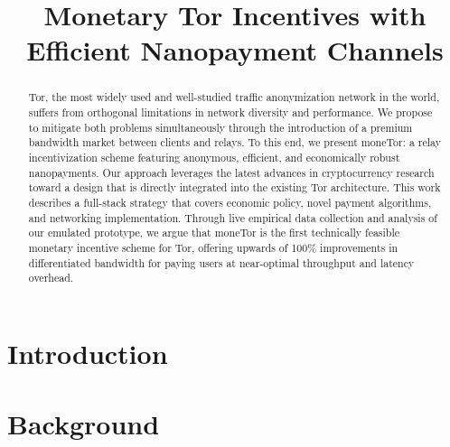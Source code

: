 \documentclass[USenglish,oneside,twocolumn]{article}
\begin{document}
 

\title{\huge Monetary Tor Incentives with Efficient Nanopayment Channels} %


\begin{abstract}
{Tor, the most widely used and well-studied traffic anonymization network in
  the world, suffers from orthogonal limitations in network diversity and
  performance. We propose to mitigate both problems simultaneously through the
  introduction of a premium bandwidth market between clients and relays. To this
  end, we present moneTor: a relay incentivization scheme featuring anonymous,
  efficient, and economically robust nanopayments. Our approach leverages the
  latest advances in cryptocurrency research toward a design that is directly
  integrated into the existing Tor architecture. This work describes a
  full-stack strategy that covers economic policy, novel payment algorithms, and
  networking implementation. Through live empirical data collection and analysis
  of our emulated prototype, we argue that moneTor is the first technically
  feasible monetary incentive scheme for Tor, offering upwards of 100\%
  improvements in differentiated bandwidth for paying users at near-optimal
  throughput and latency overhead.}
\end{abstract}



  
  
 \maketitle


\section{Introduction}
\label{sec:introduction}


\section{Background}
\label{sec:background}

\end{document}
